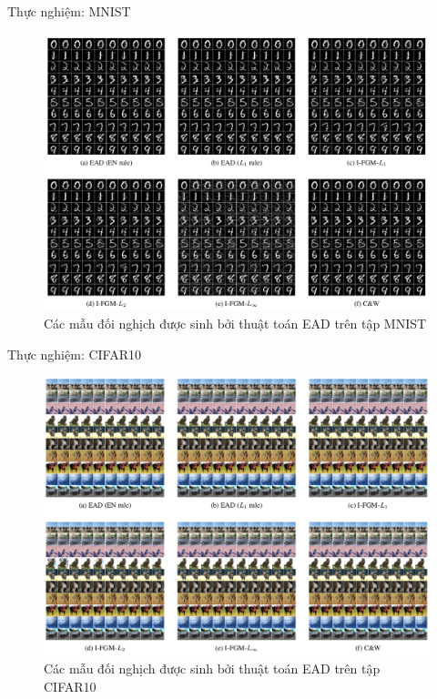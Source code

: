 \begin{frame}{Thực nghiệm: MNIST}
    \begin{figure}
        \centering
        \includegraphics[scale=0.2]{images/fig_05.png}
        \caption{Các mẫu đối nghịch được sinh bởi thuật toán EAD trên tập MNIST}%
        \label{fig:fg_05}
    \end{figure}
\end{frame}

\begin{frame}{Thực nghiệm: CIFAR10}
    \begin{figure}
        \centering
        \includegraphics[scale=0.2]{images/fig_06.png}
        \caption{Các mẫu đối nghịch được sinh bởi thuật toán EAD trên tập CIFAR10}%
        \label{fig:fg_06}
    \end{figure}
\end{frame}

